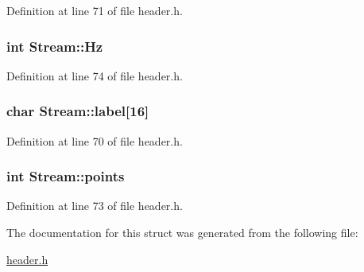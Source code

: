 Definition at line 71 of file header.h.\hypertarget{structStream_af36be19d9f235d1f9d9ba5da9db58ae8}{
\subsubsection[{Hz}]{\setlength{\rightskip}{0pt plus 5cm}int {\bf Stream::Hz}}}
\label{structStream_af36be19d9f235d1f9d9ba5da9db58ae8}


Definition at line 74 of file header.h.\hypertarget{structStream_af1b6aba00738fd5e20cd47a94ba0386b}{
\subsubsection[{label}]{\setlength{\rightskip}{0pt plus 5cm}char {\bf Stream::label}\mbox{[}16\mbox{]}}}
\label{structStream_af1b6aba00738fd5e20cd47a94ba0386b}


Definition at line 70 of file header.h.\hypertarget{structStream_a02a8da4ea08d8e4784dc5c90f1d87282}{
\subsubsection[{points}]{\setlength{\rightskip}{0pt plus 5cm}int {\bf Stream::points}}}
\label{structStream_a02a8da4ea08d8e4784dc5c90f1d87282}


Definition at line 73 of file header.h.

The documentation for this struct was generated from the following file:\begin{DoxyCompactItemize}
\item 
\hyperlink{header_8h}{header.h}\end{DoxyCompactItemize}
